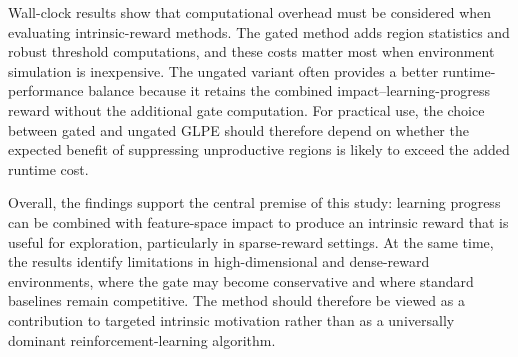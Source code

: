 Wall-clock results show that computational overhead must be considered when evaluating intrinsic-reward methods.
The gated method adds region statistics and robust threshold computations, and these costs matter most when environment simulation is inexpensive.
The ungated variant often provides a better runtime-performance balance because it retains the combined impact--learning-progress reward without the additional gate computation.
For practical use, the choice between gated and ungated GLPE should therefore depend on whether the expected benefit of suppressing unproductive regions is likely to exceed the added runtime cost.

Overall, the findings support the central premise of this study: learning progress can be combined with feature-space impact to produce an intrinsic reward that is useful for exploration, particularly in sparse-reward settings.
At the same time, the results identify limitations in high-dimensional and dense-reward environments, where the gate may become conservative and where standard baselines remain competitive.
The method should therefore be viewed as a contribution to targeted intrinsic motivation rather than as a universally dominant reinforcement-learning algorithm.